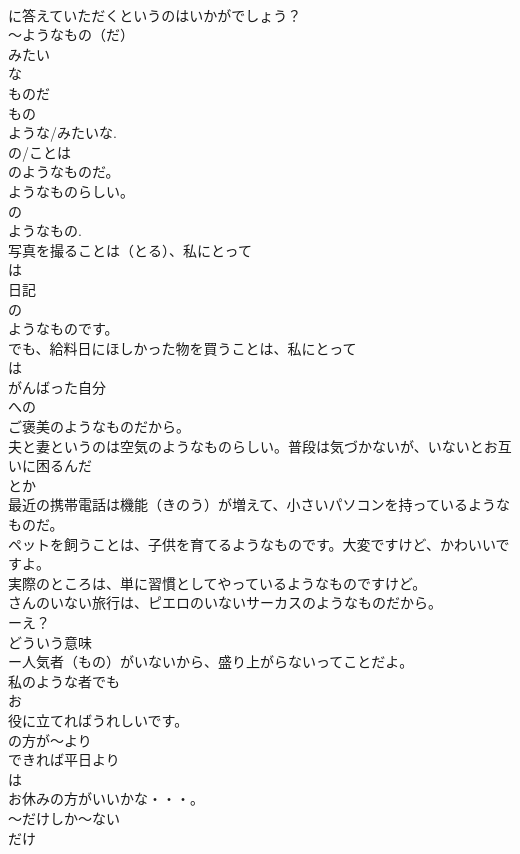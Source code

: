 \documentclass[8pt]{extreport}
\begin{document}
\begin{CJK}{UTF8}{min}
\\	に答えていただくというのはいかがでしょう？	
\\	～ようなもの（だ）
\\	みたい
\\	な
\\	ものだ 
\\	もの 
\\	ような/みたいな.
\\	の/ことは
\\	のようなものだ。 
\\	ようなものらしい。 
\\	の
\\	ようなもの.
\\	写真を撮ることは（とる）、私にとって
\\	は
\\	日記
\\	の
\\	ようなものです。
\\	でも、給料日にほしかった物を買うことは、私にとって
\\	は
\\	がんばった自分
\\	への
\\	ご褒美のようなものだから。
\\	夫と妻というのは空気のようなものらしい。普段は気づかないが、いないとお互いに困るんだ
\\	とか
\\	最近の携帯電話は機能（きのう）が増えて、小さいパソコンを持っているようなものだ。
\\	ペットを飼うことは、子供を育てるようなものです。大変ですけど、かわいいですよ。
\\	実際のところは、単に習慣としてやっているようなものですけど。
\\	さんのいない旅行は、ピエロのいないサーカスのようなものだから。
\\	ーえ？
\\	どういう意味
\\	ー人気者（もの）がいないから、盛り上がらないってことだよ。
\\	私のような者でも
\\	お
\\	役に立てればうれしいです。
\\	の方が～より
\\	できれば平日より
\\	は
\\	お休みの方がいいかな・・・。
\\	～だけしか～ない
\\	だけ

\end{CJK}
\end{document}
